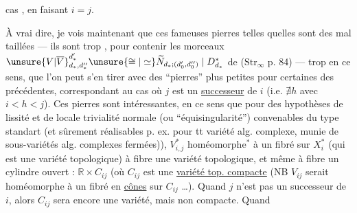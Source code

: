 cas , en faisant $i=j$.

À vrai dire, je vois maintenant que ces fameuses pierres telles quelles sont des  mal taillées — ils sont trop ,  pour contenir les morceaux $\unsure{V|\overline V}_{d_*,d''_*}^{d'_*}\unsure{\cong|\simeq}\widetilde N_{d_*;(d'_0,d''_0)}\mid D_{d_*}^*$ de ($\mathrm{Str}_\infty$ p. 84) — trop en ce sens, que l'on peut s'en tirer avec des ``pierres'' plus petites pour  certaines des précédentes, correspondant au cas où $j$ est un \uline{successeur} de $i$ (i.e. $\nexists h$ avec $i<h<j$).
Ces pierres sont  intéressantes, en ce sens que pour des hypothèses de lissité et de locale trivialité normale (ou ``équisingularité'') convenables du type standart (et sûrement réalisables p. ex. pour tt variété alg. complexe, munie de sous-variétés alg. complexes fermées)), $V_{i,j}^*$  homéomorphe${}^*$ à un fibré sur $X_i^*$ (qui est une variété topologique) à fibre une variété topologique, et même à fibre un cylindre ouvert : $\mathbb R\times C_{ij}$  (où $C_{ij}$ est une \uline{variété top. compacte} (NB $V_{ij}$ serait homéomorphe à un fibré en \uline{cônes} sur $C_{ij}$ \ldots). Quand $j$ n'est pas un successeur de $i$, alors $C_{ij}$ sera encore une variété, mais non compacte. Quand


